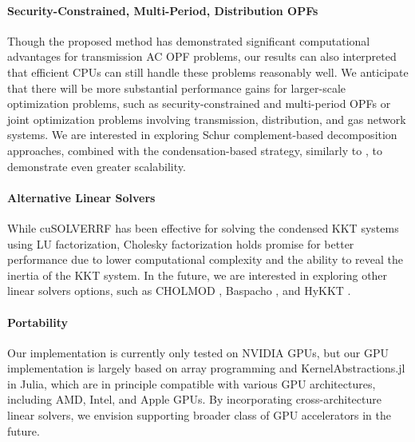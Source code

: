 \paragraph*{Security-Constrained, Multi-Period, Distribution OPFs}
Though the proposed method has demonstrated significant computational
advantages for transmission AC OPF problems, our results can also
interpreted that efficient CPUs can still handle these problems
reasonably well. We anticipate that there will be more substantial
performance gains for larger-scale optimization problems, such as
security-constrained and multi-period OPFs or joint optimization
problems involving transmission, distribution, and gas network
systems. We are interested in exploring Schur complement-based
decomposition approaches, combined with the condensation-based
strategy, similarly to \cite{pacaud2023parallel}, to demonstrate even
greater scalability.

\paragraph*{Alternative Linear Solvers}
While cuSOLVERRF has been effective for solving the condensed KKT
systems using LU factorization, Cholesky factorization holds promise
for better performance due to lower computational complexity and the
ability to reveal the inertia of the KKT system. In the future, we are
interested in exploring other linear solvers options, such as CHOLMOD
\cite{chen2008algorithm}, Baspacho \cite{pineda2022theseus}, and HyKKT
\cite{regev2023hykkt}.

\paragraph*{Portability}
Our implementation is currently only tested on NVIDIA GPUs, but our
GPU implementation is largely based on array programming and
KernelAbstractions.jl in Julia, which are in principle  compatible with
various GPU architectures, including AMD, Intel, and Apple GPUs. By
incorporating cross-architecture linear solvers, we envision
supporting broader class of GPU accelerators in the future.


